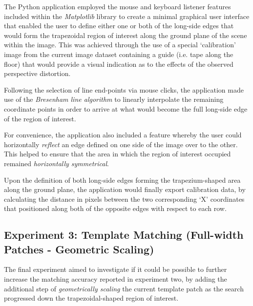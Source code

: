 The Python application employed the mouse and keyboard listener features included within the \textit{Matplotlib} library \cite{matplotlib} to create a minimal graphical user interface that enabled the user to define either one or both of the long-side edges that would form the trapezoidal region of interest along the ground plane of the scene within the image. This was achieved through the use of a special `calibration' image from the current image dataset containing a guide (i.e. tape along the floor) that would provide a visual indication as to the effects of the observed perspective distortion. 

Following the selection of line end-points via mouse clicks, the application made use of the \textit{Bresenham line algorithm} \cite{bresenham} to linearly interpolate the remaining coordinate points in order to arrive at what would become the full long-side edge of the region of interest. 

For convenience, the application also included a feature whereby the user could horizontally \textit{reflect} an edge defined on one side of the image over to the other. This helped to ensure that the area in which the region of interest occupied remained \textit{horizontally symmetrical}.

Upon the definition of both long-side edges forming the trapezium-shaped area along the ground plane, the application would finally export calibration data, by calculating the distance in pixels between the two corresponding `X' coordinates that positioned along both of the opposite edges with respect to each row.

\subsection{Experiment 3: Template Matching (Full-width Patches - Geometric Scaling)}
\label{tm-scaled}

The final experiment aimed to investigate if it could be possible to further increase the matching accuracy reported in experiment two, by adding the additional step of \textit{geometrically scaling} the current template patch as the search progressed down the trapezoidal-shaped region of interest.

